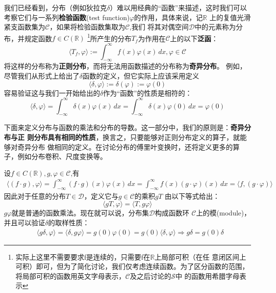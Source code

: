 \documentclass{ctexbook}
\begin{document}
我们已经看到，分布（例如狄拉克$\delta$）难以用经典的“函数”来描述，这时我们可以
考察它们与一系列\textbf{检验函数}(test function)$\varphi$的作用，具体来说，记$\mathbb{R}$
上的复值光滑紧支函数集为$\mathcal{C} $，如果将检验函数集取为$\mathcal{C}$,我们
将其对偶空间$\mathcal{D} $中的元素称为分布，并规定函数$f\in C(\mathbb{R})$
\footnote{实际上这里不需要要求f是连续的，只需要f在$\mathbb{R}$上局部可积（在任
    意闭区间上可积）即可，但为了简化讨论，我们仅考虑连续函数。为了区分函数的范围，
    将局部可积的函数用英文字母表示，$\mathcal{C} $及之后讨论的$\mathcal{S} $中
    的函数用希腊字母表示}所产生的分布$T_f$为作用在$\mathcal{C}$上的以下\textbf{泛函}：
\begin{equation}
    \langle T_f,\varphi\rangle:=\int_{-\infty}^{\infty}f(x)\varphi(x)\,dx,\varphi\in\mathcal{C}
\end{equation}
将这样的分布称为\textbf{正则分布}，而将无法用函数描述的分布称为\textbf{奇异分布}。
例如，尽管我们从形式上给出了$\delta$函数的定义，但它实际上应该采用定义
\[\langle \delta,\varphi\rangle:=\delta(\varphi):=\varphi(0)\]
容易验证这与我们一开始给出的$\delta$作为“函数”的性质是相符的：
\[\langle \delta,\varphi\rangle=\int_{-\infty}^{\infty}\delta(x)\varphi(x)\,dx=\int_{-\infty}^{\infty}\delta(x)\varphi(0)\,dx=\varphi(0)\]

下面来定义分布与函数的乘法和分布的导数。这一部分中，我们的原则是：\textbf{奇异分布与正
    则分布具有相同的性质}，换言之，只要能够对正则分布定义的算子，就能够对奇异分布
做相同的定义。在讨论分布的傅里叶变换时，还将定义更多的算子，例如分布卷积、尺度变换等。

设$f\in C(\mathbb{R}),g,\varphi\in\mathcal{C} $,有
\begin{align*}
    \langle (f\cdot g),\varphi\rangle=\int_{-\infty}^{\infty}(f\cdot g)(x)\varphi(x)\,dx=\int_{-\infty}^{\infty}f(x)(g\cdot\varphi)(x)\,dx=\langle f,(g\cdot\varphi)\rangle
\end{align*}
因此对于任意的分布$T\in\mathcal{D} $，定义它与$g\in\mathcal{C} $的乘积$gT$
由以下等式给出：
\begin{equation}
    \langle gT,\varphi\rangle=\langle T,g\varphi\rangle
\end{equation}
$g\varphi$就是普通的函数乘法。现在就可以说，分布集$\mathcal{D} $构成函数环
$\mathcal{C} $上的模(module)，并且可以验证$\delta$的取样性质：
\begin{align*}
     & \langle g\delta,\varphi\rangle=\langle \delta,g\varphi\rangle=g(0)\varphi(0)=g(0)\langle\delta,\varphi\rangle \Rightarrow  g\delta=g(0)\delta
\end{align*}
\end{document}
